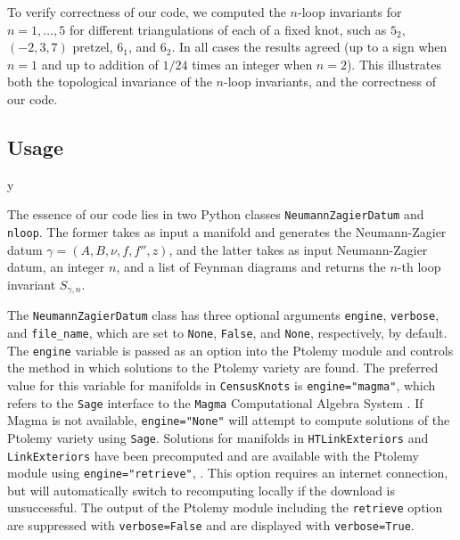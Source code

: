 \documentclass[12pt]{amsart}
\theoremstyle{definition}
\def\printname#1{
        \if\draft y
                \smash{\makebox[0pt]{\hspace{-0.5in}
                        \raisebox{8pt}{\tt\tiny #1}}}
        \fi
}
\def\lbl#1{\label{#1}\printname{#1}}
\def\ga{\gamma}
\begin{document}
To verify correctness of our code, we computed the $n$-loop invariants for
$n=1,\dots,5$ for different triangulations of each of a fixed knot, such 
as $5_2$, $(-2,3,7)$ pretzel, $6_1$, and $6_2$. In all cases the results 
agreed (up to a sign when $n=1$ and up to addition of $1/24$ times an integer 
when $n=2$). This illustrates both the topological invariance of the 
$n$-loop invariants, and the correctness of our code.

\subsection{Usage}
\lbl{sub.usage}

The essence of our code lies in two Python classes \texttt{NeumannZagierDatum}
and \texttt{nloop}. The former takes as input a manifold and generates the 
Neumann-Zagier datum $\ga=(A,B,\nu,f,f'',z)$, and the latter takes as input
Neumann-Zagier datum, an integer $n$, and a list of Feynman diagrams
and returns the $n$-th loop invariant $S_{\gamma,n}$.

The \texttt{NeumannZagierDatum} class has three optional arguments
\texttt{engine}, \texttt{verbose}, and \texttt{file\_name}, which are set to 
\texttt{None}, \texttt{False}, and \texttt{None}, respectively, by default. 
The \texttt{engine} variable is passed as an option into the Ptolemy module 
and controls the method in which solutions to the Ptolemy variety are found. 
The preferred value for this variable for manifolds in \texttt{CensusKnots} 
is \texttt{engine="magma"}, which refers to the \texttt{Sage} interface to 
the \texttt{Magma} Computational Algebra System \cite{magma}.
If Magma is not available, \texttt{engine="None"} will attempt to compute 
solutions of the Ptolemy variety using \texttt{Sage}. 
Solutions for 
manifolds in \texttt{HTLinkExteriors} and \texttt{LinkExteriors} have been 
precomputed and are available with the Ptolemy module using 
\texttt{engine="retrieve"}, \cite{Ga:ptolemy}. This option requires an 
internet connection, but will automatically switch to recomputing locally 
if the download is unsuccessful. The output of the Ptolemy module including the
\texttt{retrieve} option are suppressed with \texttt{verbose=False} and are
displayed with \texttt{verbose=True}.
\end{document}
